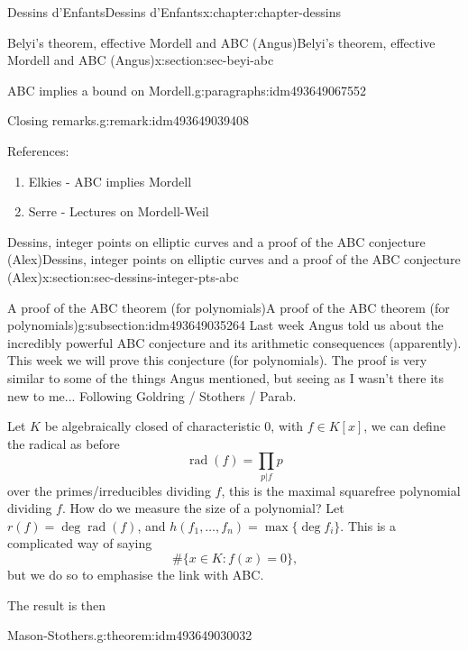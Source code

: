 \documentclass[oneside,10pt,]{book}
\numberwithin{equation}{section}
\newcommand{\lb}{[}
\newcommand{\rb}{]}
\begin{document}
\begin{chapterptx}{Dessins d'Enfants}{}{Dessins d'Enfants}{}{}{x:chapter:chapter-dessins}
\begin{sectionptx}{Belyi's theorem, effective Mordell and ABC (Angus)}{}{Belyi's theorem, effective Mordell and ABC (Angus)}{}{}{x:section:sec-beyi-abc}
\begin{paragraphs}{ABC implies a bound on Mordell.}{g:paragraphs:idm493649067552}
\begin{remark}{Closing remarks.}{g:remark:idm493649039408}
\end{remark}
References:%
\begin{enumerate}
\item{}Elkies - ABC implies Mordell%
\item{}Serre - Lectures on Mordell-Weil%
\end{enumerate}
%
\end{paragraphs}%
\end{sectionptx}
%
%
\typeout{************************************************}
\typeout{************************************************}
%
\begin{sectionptx}{Dessins, integer points on elliptic curves and a proof of the ABC conjecture (Alex)}{}{Dessins, integer points on elliptic curves and a proof of the ABC conjecture (Alex)}{}{}{x:section:sec-dessins-integer-pts-abc}
%
%
\typeout{************************************************}
\typeout{************************************************}
%
\begin{subsectionptx}{A proof of the ABC theorem (for polynomials)}{}{A proof of the ABC theorem (for polynomials)}{}{}{g:subsection:idm493649035264}
Last week Angus told us about the incredibly powerful ABC conjecture and its arithmetic consequences (apparently). This week we will prove this conjecture (for polynomials). The proof is very similar to some of the things Angus mentioned, but seeing as I wasn't there its new to me... Following Goldring \slash{} Stothers \slash{} Parab.%
\par
Let \(K\) be algebraically closed of characteristic 0, with \(f \in K\lb x \rb\), we can define the radical as before%
\begin{equation*}
\operatorname{rad}(f) = \prod_{p | f} p
\end{equation*}
over the primes\slash{}irreducibles dividing \(f\), this is the maximal squarefree polynomial dividing \(f\). How do we measure the size of a polynomial? Let \(r(f) = \deg \operatorname{rad}(f)\), and \(h(f_1, \ldots, f_n) = \max\{\deg f_i\}\). This is a complicated way of saying%
\begin{equation*}
\#\{x \in K : f(x) = 0 \}\text{,}
\end{equation*}
but we do so to emphasise the link with ABC.%
\par
The result is then%
\begin{theorem}{Mason-Stothers.}{}{g:theorem:idm493649030032}%

\end{theorem}
\end{subsectionptx}
\end{sectionptx}
\end{chapterptx}
\end{document}
